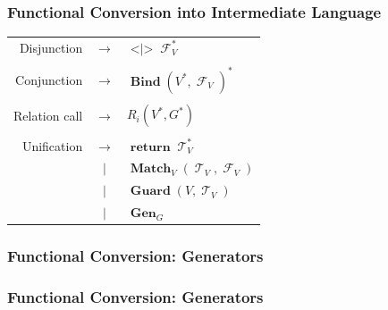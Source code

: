 \documentclass[xcolor=table, aspectratio=169]{beamer}
\DeclareMathOperator{\Term}{\mathcal{T}}
\DeclareMathOperator{\Fun}{\mathcal{F}}
\DeclareMathOperator{\Rtrn}{\mathbf{return}}
\DeclareMathOperator{\Bind}{\mathbf{Bind}}
\DeclareMathOperator{\Match}{\mathbf{Match}}
\DeclareMathOperator{\Sum}{\mathbf{<|>}}
\DeclareMathOperator{\Guard}{\mathbf{Guard}}
\DeclareMathOperator{\Gen}{\mathbf{Gen}}
\newcommand{\LIST}[1]{ #1^*}
\begin{document}
\begin{frame}[fragile]
  \frametitle{Functional Conversion into Intermediate Language}
\begin{center}
\begin{tabular}{rcl}
  Disjunction   & $\rightarrow$ & $\Sum\LIST{\Fun_{V}}$ \\ && \\
  Conjunction   & $\rightarrow$ & $ \Bind\LIST{\left(\LIST{V}, \Fun_{V}\right)}$ \\ && \\
  Relation call & $\rightarrow$ & $ R_{i}(\LIST{V}, \LIST{G})$ \\ && \\
  Unification   & $\rightarrow$ & $\Rtrn \LIST{\Term_{V}}$ \\
                & $|$           & $\Match_{V} \left( \Term_{V}, \Fun_{V} \right)$ \\
                & $|$           & $\Guard\left( V, \Term_{V}\right)$ \\
                & $|$           & $\Gen_{G}$
\end{tabular}
\end{center}
\end{frame}


\begin{frame}[fragile]
  \frametitle{Functional Conversion: Generators}






\end{frame}

\begin{frame}[fragile]
  \frametitle{Functional Conversion: Generators}



    
\end{frame}
\end{document}
